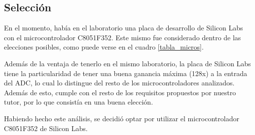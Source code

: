 \subsection{Selecci\'on} %
\label{sub:seleccion}

En el momento, hab\'ia en el laboratorio una placa de desarrollo de Silicon Labs con el microcontrolador C8051F352. Este mismo fue considerado dentro de las elecciones posibles, como puede verse en el cuadro \ref{tabla_micros}.

Adem\'as de la ventaja de tenerlo en el mismo laboratorio, la placa de Silicon Labs tiene la particularidad de tener una buena ganancia m\'axima (128x) a la entrada del ADC, lo cual lo distingue del resto de los microcontroladores analizados. Adem\'as de esto, cumple con el resto de los requisitos propuestos por nuestro tutor, por lo que consist\'ia en una buena elecci\'on.

Habiendo hecho este an\'alisis, se decidi\'o optar por utilizar el microcontrolador C8051F352 de Silicon Labs.




\clearpage
